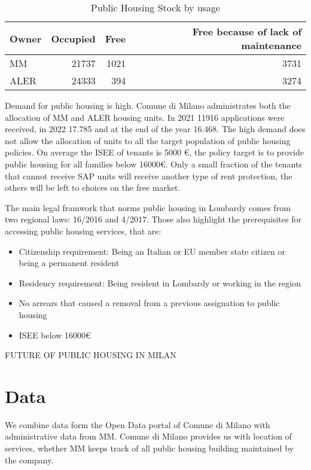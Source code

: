 \documentclass[11pt, titlepage]{article}
\begin{document}
\begin{table}
	\centering
	\begin{tabular}{lrrr}
		\toprule
		Owner & Occupied & Free & Free because of lack of maintenance\\
		\midrule
		MM & 21737&1021&3731\\
		ALER& 24333&394&3274\\
		\bottomrule
	\end{tabular}
	\caption{Public Housing Stock by usage}
\end{table}

Demand for public housing is high. Comune di Milano administrates both the allocation of MM and ALER housing units. In 2021 11916 applications were received, in 2022 17.785 and at the end of the year 16.468. The high demand does not allow the allocation of units to all the target population of public housing policies. On average the ISEE of tenants is 5000 €, the policy target is to provide public housing for all families below 16000€. Only a small fraction of the tenants that cannot receive SAP units will receive another type of rent protection, the others will be left to choices on the free market. \parencite{comune2023}

 The main legal framwork that norms public housing in Lombardy comes from two regional laws: 16/2016 and 4/2017. Those also highlight the prerequisites for accessing public housing services, that are:
\begin{itemize}
	\item Citizenship requirement: Being an Italian or EU member state citizen or being a permanent resident
	\item Residency requirement: Being resident in Lombardy or working in the region
	\item No arrears that caused a removal from a previous assignation to public housing 
	\item ISEE below 16000€
\end{itemize} 
\parencite{Incorvaia}



FUTURE OF PUBLIC HOUSING IN MILAN 

\section{Data}\label{data}

We combine data form the Open Data portal of Comune di Milano with administrative data from MM. Comune di Milano provides us with location of services, whether MM keeps track of all public housing building maintained by the company. 
\end{document}
